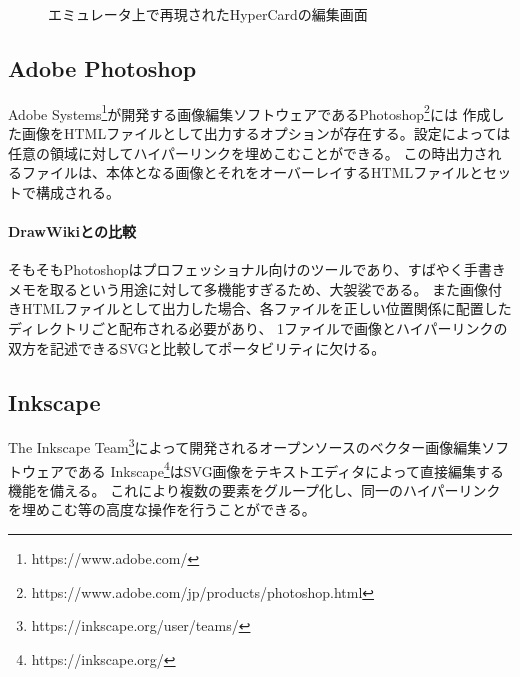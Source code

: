 \begin{figure}[H]
    \centering
    \caption{エミュレータ上で再現されたHyperCardの編集画面}
    \label{fig:hypercard}
\end{figure}

\subsection{Adobe Photoshop}
Adobe Systems\footnote{https://www.adobe.com/}が開発する画像編集ソフトウェアであるPhotoshop\footnote{https://www.adobe.com/jp/products/photoshop.html}には
作成した画像をHTMLファイルとして出力するオプションが存在する。設定によっては任意の領域に対してハイパーリンクを埋めこむことができる。
この時出力されるファイルは、本体となる画像とそれをオーバーレイするHTMLファイルとセットで構成される。

\paragraph*{DrawWikiとの比較}
そもそもPhotoshopはプロフェッショナル向けのツールであり、すばやく手書きメモを取るという用途に対して多機能すぎるため、大袈裟である。
また画像付きHTMLファイルとして出力した場合、各ファイルを正しい位置関係に配置したディレクトリごと配布される必要があり、
1ファイルで画像とハイパーリンクの双方を記述できるSVGと比較してポータビリティに欠ける。

\subsection{Inkscape}
The Inkscape Team\footnote{https://inkscape.org/user/teams/}によって開発されるオープンソースのベクター画像編集ソフトウェアである
Inkscape\footnote{https://inkscape.org/}はSVG画像をテキストエディタによって直接編集する機能を備える。
これにより複数の要素をグループ化し、同一のハイパーリンクを埋めこむ等の高度な操作を行うことができる。

